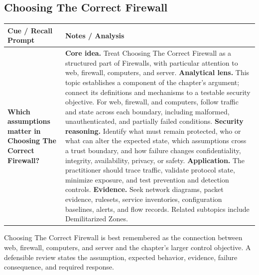 \documentclass[11pt]{article}
\newcommand{\CornellHeader}{%
\rowcolor{Navy}\color{white}\bfseries Cue / Recall Prompt & \color{white}\bfseries Notes / Analysis\\\hline}
\newcommand{\CornellRow}[2]{%
\cellcolor{CueGray}\RaggedRight\textbf{#1} & \RaggedRight #2\\\hline}
\begin{document}
\subsection*{Choosing The Correct Firewall}
\begin{longtable}{>{\RaggedRight\arraybackslash}p{}|>{\RaggedRight\arraybackslash}p{}}
\CornellHeader
\CornellRow{Which assumptions matter in Choosing The Correct Firewall?}{\textbf{Core idea.} Treat Choosing The Correct Firewall as a structured part of Firewalls, with particular attention to web, firewall, computers, and server. \textbf{Analytical lens.} This topic establishes a component of the chapter's argument; connect its definitions and mechanisms to a testable security objective. For web, firewall, and computers, follow traffic and state across each boundary, including malformed, unauthenticated, and partially failed conditions. \textbf{Security reasoning.} Identify what must remain protected, who or what can alter the expected state, which assumptions cross a trust boundary, and how failure changes confidentiality, integrity, availability, privacy, or safety. \textbf{Application.} The practitioner should trace traffic, validate protocol state, minimize exposure, and test prevention and detection controls. \textbf{Evidence.} Seek network diagrams, packet evidence, rulesets, service inventories, configuration baselines, alerts, and flow records. Related subtopics include Demilitarized Zones.}
\end{longtable}
\begin{topicsummary}
Choosing The Correct Firewall is best remembered as the connection between web, firewall, computers, and server and the chapter's larger control objective. A defensible review states the assumption, expected behavior, evidence, failure consequence, and required response.
\end{topicsummary}
\end{document}
